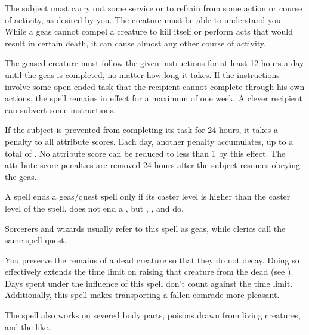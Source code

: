 \begin{spelleffect}
The subject must carry out some service or to refrain from some action or course of activity, as desired by you. The creature must be able to understand you. While a geas cannot compel a creature to kill itself or perform acts that would result in certain death, it can cause almost any other course of activity.

The geased creature must follow the given instructions for at least 12 hours a day until the geas is completed, no matter how long it takes. If the instructions involve some open-ended task that the recipient cannot complete through his own actions, the spell remains in effect for a maximum of one week. A clever recipient can subvert some instructions.
\par If the subject is prevented from completing its task for 24 hours, it takes a  penalty to all attribute scores. Each day, another  penalty accumulates, up to a total of . No attribute score can be reduced to less than 1 by this effect. The attribute score penalties are removed 24 hours after the subject resumes obeying the geas.
\end{spelleffect}
\begin{spellnotes}
\par A  spell ends a geas/quest spell only if its caster level is higher than the caster level of the  spell.  does not end a , but , , and  do.
\par Sorcerers and wizards usually refer to this spell as geas, while clerics call the same spell quest.
\end{spellnotes}

\begin{spelleffect}
You preserve the remains of a dead creature so that they do not decay. Doing so effectively extends the time limit on raising that creature from the dead (see ). Days spent under the influence of this spell don't count against the time limit. Additionally, this spell makes transporting a fallen comrade more pleasant.
\par The spell also works on severed body parts, poisons drawn from living creatures, and the like.
\end{spelleffect}

